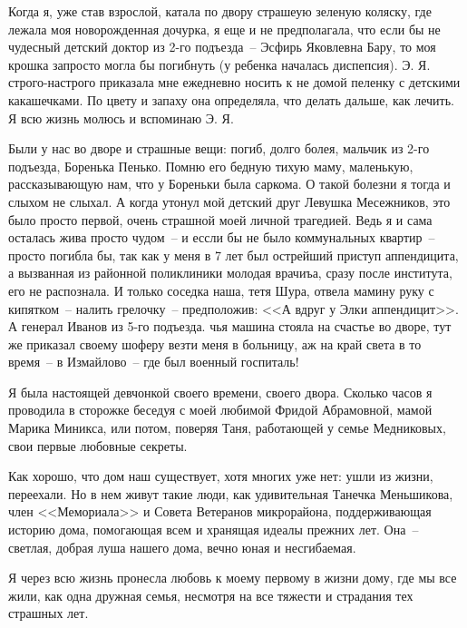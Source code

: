 Когда я, уже став взрослой, катала по двору страшеую зеленую коляску, где лежала моя новорожденная дочурка, я еще и не предполагала, что если бы не чудесный детский доктор из 2-го подъезда~-- Эсфирь Яковлевна Бару, то моя крошка запросто могла бы погибнуть (у ребенка началась диспепсия). Э. Я. строго-настрого приказала мне ежедневно носить к не домой пеленку с детскими какашечками. По цвету и запаху она определяла, что делать дальше, как лечить. Я всю жизнь молюсь и вспоминаю Э. Я.

Были у нас во дворе и страшные вещи: погиб, долго болея, мальчик из 2-го подъезда, Боренька Пенько. Помню его бедную тихую маму, маленькую, рассказывающую нам, что у Бореньки была саркома. О такой болезни я тогда и слыхом не слыхал. А когда утонул мой детский друг Левушка Месежников, это было просто первой, очень страшной моей личной трагедией. Ведь я и сама осталась жива просто чудом~-- и ессли бы не было коммунальных квартир~-- просто погибла бы, так как у меня в 7 лет был острейший приступ аппендицита, а вызванная из районной поликлиники молодая врачиъа, сразу после института, его не распознала. И только соседка наша, тетя Шура, отвела мамину руку с кипятком~-- налить грелочку~-- предположив: <<А вдруг у Элки аппендицит>>. А генерал Иванов из 5-го подъезда. чья машина стояла на счастье во дворе, тут же приказал своему шоферу везти меня в больницу, аж на край света в то время~-- в Измайлово~-- где был военный госпиталь!

Я была настоящей девчонкой своего времени, своего двора. Сколько часов я проводила в сторожке беседуя с моей любимой Фридой Абрамовной, мамой Марика Миникса, или потом, поверяя Таня, работающей у семье Медниковых, свои первые любовные секреты.

Как хорошо, что дом наш существует, хотя многих уже нет: ушли из жизни, переехали. Но в нем живут такие люди, как удивительная Танечка Меньшикова, член <<Мемориала>> и Совета Ветеранов микрорайона, поддерживающая историю дома, помогающая всем и хранящая идеалы прежних лет. Она~-- светлая, добрая луша нашего дома, вечно юная и несгибаемая.

Я через всю  жизнь пронесла любовь к моему первому в жизни дому, где мы все жили, как одна дружная семья, несмотря на все тяжести и страдания тех страшных лет.

 
